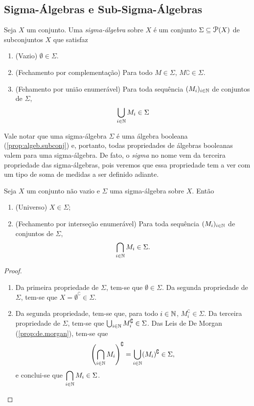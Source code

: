 \subsection{Sigma-Álgebras e Sub-Sigma-Álgebras}

\begin{defi}
	Seja $X$ um conjunto. Uma \emph{sigma-álgebra} sobre $X$ é um conjunto $\Sigma \subseteq \p(X)$ de subconjuntos $X$ que satisfaz
	\begin{enumerate}
	\item (Vazio) $\emptyset \in \Sigma$.
	\item (Fechamento por complementação) Para todo $M \in \Sigma$, $M\complement \in \Sigma$.
	\item (Fehamento por união enumerável) Para toda sequência $(M_i)_{i \in \mathbb{N}}$ de conjuntos de $\Sigma$,
	\begin{equation*}
	\bigcup_{i \in \mathbb{N}} M_i \in \Sigma
	\end{equation*}
	\end{enumerate}
\end{defi}

	Vale notar que uma sigma-álgebra $\Sigma$ é uma álgebra booleana (\ref{prop:algeb.subconj}) e, portanto, todas propriedades de álgebras booleanas valem para uma sigma-álgebra. De fato, o \textit{sigma} no nome vem da terceira propriedade das sigma-álgebras, pois veremos que essa propriedade tem a ver com um tipo de soma de medidas a ser definido adiante.

\begin{prop}
	Seja $X$ um conjunto não vazio e $\Sigma$ uma sigma-álgebra sobre $X$. Então
	\begin{enumerate}
	\item (Universo) $X \in \Sigma$;
	\item (Fechamento por interseção enumerável) Para toda sequência $(M_i)_{i \in \mathbb{N}}$ de conjuntos de $\Sigma$,
	\begin{equation*}
	\bigcap_{i \in \mathbb{N}} M_i \in \Sigma.
	\end{equation*}
	\end{enumerate}
\end{prop}
\begin{proof}
	\begin{enumerate}
	\item Da primeira propriedade de $\Sigma$, tem-se que $\emptyset \in \Sigma$. Da segunda propriedade de $\Sigma$, tem-se que $X = \emptyset^\complement \in \Sigma$.
	\item Da segunda propriedade, tem-se que, para todo $i \in \mathbb{N}$, $M_i^\complement \in \Sigma$. Da terceira propriedade de $\Sigma$, tem-se que $\bigcup_{i \in \mathbb{N}} M_i^\complement \in \Sigma$. Das Leis de De Morgan (\ref{prop:de.morgan}), tem-se que
	\begin{equation*}
	\left(\bigcap_{i \in \mathbb{N}} M_i \right)^\complement = \bigcup_{i \in \mathbb{N}} (M_i)^\complement \in \Sigma,
	\end{equation*}
e conclui-se que $\displaystyle\bigcap_{i \in \mathbb{N}} M_i \in \Sigma$.
	\end{enumerate}
\end{proof}

